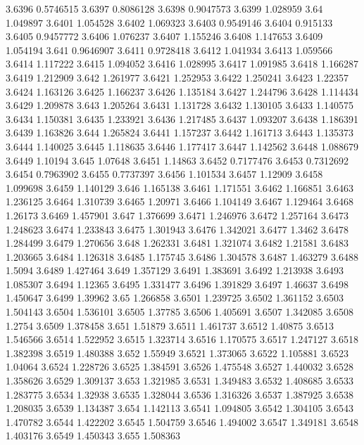 3.6396  0.5746515
3.6397  0.8086128
3.6398  0.9047573
3.6399  1.028959
3.64  1.049897
3.6401  1.054528
3.6402  1.069323
3.6403  0.9549146
3.6404  0.915133
3.6405  0.9457772
3.6406  1.076237
3.6407  1.155246
3.6408  1.147653
3.6409  1.054194
3.641  0.9646907
3.6411  0.9728418
3.6412  1.041934
3.6413  1.059566
3.6414  1.117222
3.6415  1.094052
3.6416  1.028995
3.6417  1.091985
3.6418  1.166287
3.6419  1.212909
3.642  1.261977
3.6421  1.252953
3.6422  1.250241
3.6423  1.22357
3.6424  1.163126
3.6425  1.166237
3.6426  1.135184
3.6427  1.244796
3.6428  1.114434
3.6429  1.209878
3.643  1.205264
3.6431  1.131728
3.6432  1.130105
3.6433  1.140575
3.6434  1.150381
3.6435  1.233921
3.6436  1.217485
3.6437  1.093207
3.6438  1.186391
3.6439  1.163826
3.644  1.265824
3.6441  1.157237
3.6442  1.161713
3.6443  1.135373
3.6444  1.140025
3.6445  1.118635
3.6446  1.177417
3.6447  1.142562
3.6448  1.088679
3.6449  1.10194
3.645  1.07648
3.6451  1.14863
3.6452  0.7177476
3.6453  0.7312692
3.6454  0.7963902
3.6455  0.7737397
3.6456  1.101534
3.6457  1.12909
3.6458  1.099698
3.6459  1.140129
3.646  1.165138
3.6461  1.171551
3.6462  1.166851
3.6463  1.236125
3.6464  1.310739
3.6465  1.20971
3.6466  1.104149
3.6467  1.129464
3.6468  1.26173
3.6469  1.457901
3.647  1.376699
3.6471  1.246976
3.6472  1.257164
3.6473  1.248623
3.6474  1.233843
3.6475  1.301943
3.6476  1.342021
3.6477  1.3462
3.6478  1.284499
3.6479  1.270656
3.648  1.262331
3.6481  1.321074
3.6482  1.21581
3.6483  1.203665
3.6484  1.126318
3.6485  1.175745
3.6486  1.304578
3.6487  1.463279
3.6488  1.5094
3.6489  1.427464
3.649  1.357129
3.6491  1.383691
3.6492  1.213938
3.6493  1.085307
3.6494  1.12365
3.6495  1.331477
3.6496  1.391829
3.6497  1.46637
3.6498  1.450647
3.6499  1.39962
3.65  1.266858
3.6501  1.239725
3.6502  1.361152
3.6503  1.504143
3.6504  1.536101
3.6505  1.37785
3.6506  1.405691
3.6507  1.342085
3.6508  1.2754
3.6509  1.378458
3.651  1.51879
3.6511  1.461737
3.6512  1.40875
3.6513  1.546566
3.6514  1.522952
3.6515  1.323714
3.6516  1.170575
3.6517  1.247127
3.6518  1.382398
3.6519  1.480388
3.652  1.55949
3.6521  1.373065
3.6522  1.105881
3.6523  1.04064
3.6524  1.228726
3.6525  1.384591
3.6526  1.475548
3.6527  1.440032
3.6528  1.358626
3.6529  1.309137
3.653  1.321985
3.6531  1.349483
3.6532  1.408685
3.6533  1.283775
3.6534  1.32938
3.6535  1.328044
3.6536  1.316326
3.6537  1.387925
3.6538  1.208035
3.6539  1.134387
3.654  1.142113
3.6541  1.094805
3.6542  1.304105
3.6543  1.470782
3.6544  1.422202
3.6545  1.504759
3.6546  1.494002
3.6547  1.349181
3.6548  1.403176
3.6549  1.450343
3.655  1.508363
